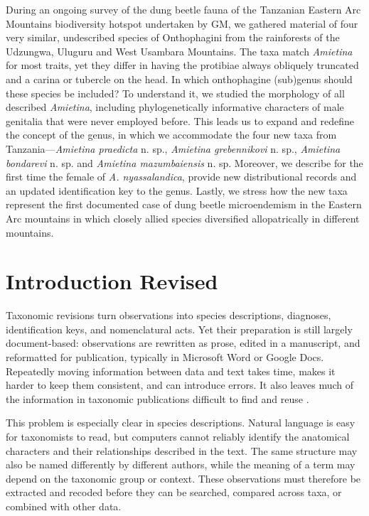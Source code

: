 During an ongoing survey of the dung beetle fauna of the Tanzanian Eastern Arc Mountains biodiversity hotspot undertaken by GM, we gathered material of four very similar, undescribed species of Onthophagini from the rainforests of the Udzungwa, Uluguru and West Usambara Mountains. The taxa match \textit{Amietina} for most traits, yet they differ in having the protibiae always obliquely truncated and a carina or tubercle on the head. In which onthophagine (sub)genus should these species be included? To understand it, we studied the morphology of all described \textit{Amietina}, including phylogenetically informative characters of male genitalia that were never employed before. This leads us to expand and redefine the concept of the genus, in which we accommodate the four new taxa from Tanzania---\textit{Amietina praedicta} n. sp., \textit{Amietina grebennikovi} n. sp., \textit{Amietina bondarevi} n. sp. and \textit{Amietina mazumbaiensis} n. sp. Moreover, we describe for the first time the female of \textit{A. nyassalandica}, provide new distributional records and an updated identification key to the genus. Lastly, we stress how the new taxa represent the first documented case of dung beetle microendemism in the Eastern Arc mountains in which closely allied species diversified allopatrically in different mountains.


\section*{Introduction Revised}

Taxonomic revisions turn observations into species descriptions, diagnoses, identification keys, and nomenclatural acts. Yet their preparation is still largely document-based: observations are rewritten as prose, edited in a manuscript, and reformatted for publication, typically in Microsoft Word or Google Docs. Repeatedly moving information between data and text takes time, makes it harder to keep them consistent, and can introduce errors. It also leaves much of the information in taxonomic publications difficult to find and reuse \citep{smith2013beyond, miller2012cybertaxonomic, penev2017strategies}.

This problem is especially clear in species descriptions. Natural language is easy for taxonomists to read, but computers cannot reliably identify the anatomical characters and their relationships described in the text. The same structure may also be named differently by different authors, while the meaning of a term may depend on the taxonomic group or context. These observations must therefore be extracted and recoded before they can be searched, compared across taxa, or combined with other data.

